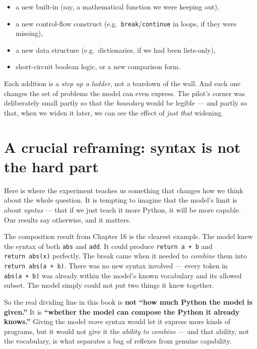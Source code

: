 \begin{itemize}
\tightlist
\item
  a new built-in (say, a mathematical function we were keeping out),
\item
  a new control-flow construct (e.g.~\texttt{break}/\texttt{continue} in
  loops, if they were missing),
\item
  a new data structure (e.g.~dictionaries, if we had been lists-only),
\item
  short-circuit boolean logic, or a new comparison form.
\end{itemize}

Each addition is a \emph{step up a ladder}, not a teardown of the wall.
And each one changes the set of problems the model can even express. The
pilot's corner was deliberately small partly so that the \emph{boundary}
would be legible --- and partly so that, when we widen it later, we can
see the effect of \emph{just that} widening.

\section{A crucial reframing: syntax is not the hard
part}\label{a-crucial-reframing-syntax-is-not-the-hard-part}

Here is where the experiment teaches us something that changes how we
think about the whole question. It is tempting to imagine that the
model's limit is about \emph{syntax} --- that if we just teach it more
Python, it will be more capable. Our results say otherwise, and it
matters.

The composition result from Chapter 16 is the clearest example. The
model knew the syntax of both \texttt{abs} and \texttt{add}. It could
produce \texttt{return\ a\ +\ b} and \texttt{return\ abs(x)} perfectly.
The break came when it needed to \emph{combine} them into
\texttt{return\ abs(a\ +\ b)}. There was no new syntax involved ---
every token in \texttt{abs(a\ +\ b)} was already within the model's
known vocabulary and its allowed subset. The model simply could not put
two things it knew together.

So the real dividing line in this book is \textbf{not ``how much Python
the model is given.''} It is \textbf{``whether the model can compose the
Python it already knows.''} Giving the model \emph{more} syntax would
let it express more kinds of programs, but it would not give it the
\emph{ability to combine} --- and that ability, not the vocabulary, is
what separates a bag of reflexes from genuine capability.

